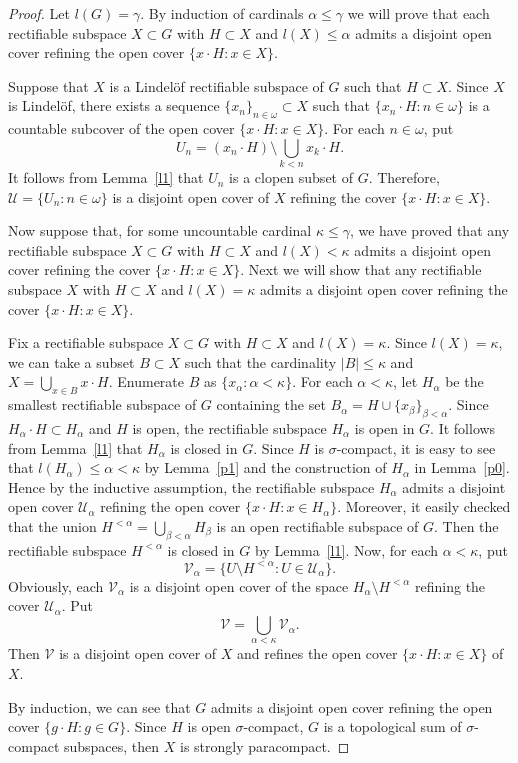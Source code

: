 \documentclass[psamsfonts,fceqn,leqno]{amsart}
\theoremstyle{definition}
\begin{document}
\begin{proof}
Let $l(G)=\gamma$. By induction of cardinals $\alpha\leq \gamma$ we will prove that each rectifiable subspace $X\subset G$ with $H\subset X$ and $l(X)\leq\alpha$ admits a disjoint open cover refining the open cover $\{x\cdot H: x\in X\}$.

Suppose that $X$ is a Lindel\"{o}f rectifiable subspace of $G$ such that $H\subset X$. Since $X$ is Lindel\"{o}f, there exists a sequence $\{x_{n}\}_{n\in\omega}\subset X$ such that $\{x_{n}\cdot H: n\in \omega\}$ is a countable subcover of the open cover $\{x\cdot H: x\in X\}$. For each $n\in\omega$, put
$$U_{n}=(x_{n}\cdot H)\setminus\bigcup_{k<n}x_{k}\cdot H. $$It follows from Lemma~\ref{l1} that $U_{n}$ is a clopen subset of $G$. Therefore, $\mathscr{U}=\{U_{n}: n\in \omega\}$ is a disjoint open cover of $X$ refining the cover $\{x\cdot H: x\in X\}$.

Now suppose that, for some uncountable cardinal $\kappa\leq\gamma$, we have proved that any rectifiable subspace $X\subset G$ with $H\subset X$ and $l(X)<\kappa$ admits a disjoint open cover refining the cover $\{x\cdot H: x\in X\}$. Next we will show that any rectifiable subspace $X$ with $H\subset X$ and $l(X)=\kappa$ admits a disjoint open cover refining the cover $\{x\cdot H: x\in X\}$.

Fix a rectifiable subspace $X\subset G$ with $H\subset X$ and $l(X)=\kappa$. Since $l(X)=\kappa$, we can take a subset $B\subset X$ such that the cardinality $|B|\leq\kappa$ and $X=\bigcup_{x\in B} x\cdot H$. Enumerate $B$ as $\{x_{\alpha}: \alpha<\kappa\}$. For each $\alpha<\kappa$, let $H_{\alpha}$ be the smallest rectifiable subspace of $G$ containing the set $B_{\alpha}=H\cup \{x_{\beta}\}_{\beta<\alpha}$. Since $H_{\alpha}\cdot H\subset H_{\alpha}$ and $H$ is open, the rectifiable subspace $H_{\alpha}$ is open in $G$. It follows from Lemma~\ref{l1} that $H_{\alpha}$ is closed in $G$. Since $H$ is $\sigma$-compact, it is easy to see that $l(H_{\alpha})\leq\alpha<\kappa$ by Lemma~\ref{p1} and the construction of $H_{\alpha}$ in Lemma~\ref{p0}. Hence by the inductive assumption, the rectifiable subspace $H_{\alpha}$ admits a disjoint open cover $\mathscr{U}_{\alpha}$ refining the open cover $\{x\cdot H: x\in H_{\alpha}\}$. Moreover, it easily checked that the union $H^{<\alpha}=\bigcup_{\beta<\alpha}H_{\beta}$ is an open rectifiable subspace of $G$. Then the rectifiable subspace $H^{<\alpha}$ is closed in $G$ by Lemma~\ref{l1}. Now, for each $\alpha<\kappa$, put $$\mathscr{V}_{\alpha}=\{U\setminus H^{<\alpha}: U\in \mathscr{U}_{\alpha}\}.$$ Obviously, each $\mathscr{V}_{\alpha}$ is a disjoint open cover of the space $H_{\alpha}\setminus H^{<\alpha}$ refining the cover $\mathscr{U}_{\alpha}$. Put $$\mathscr{V}=\bigcup_{\alpha<\kappa}\mathscr{V}_{\alpha}.$$ Then $\mathscr{V}$ is a disjoint open cover of $X$ and refines the open cover $\{x\cdot H: x\in X\}$ of $X$.

By induction, we can see that $G$ admits a disjoint open cover refining the open cover $\{g\cdot H: g\in G\}$. Since $H$ is open $\sigma$-compact, $G$ is a topological sum of $\sigma$-compact subspaces, then $X$ is strongly paracompact.
\end{proof}
\end{document}

